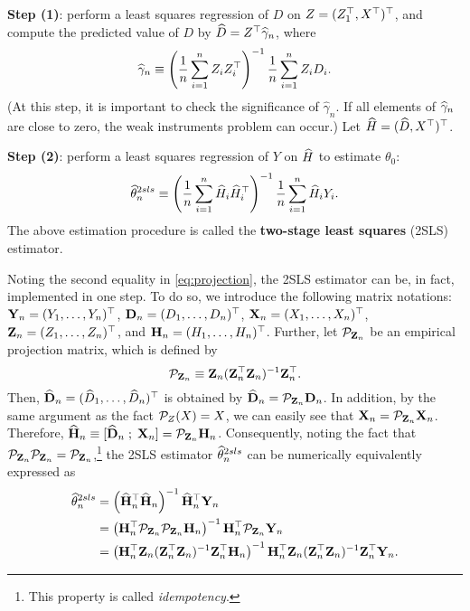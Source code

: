 \documentclass[11pt, A4paper, openany, uplatex]{book}
\begin{document}
\textbf{Step (1)}: perform a least squares regression of $D$ on $Z = (Z_1^\top, X^\top)^\top$, and compute the predicted value of $D$ by $\widehat D = Z^\top \widehat \gamma_n$, where
\[
\widehat \gamma_n \equiv \left( \frac{1}{n}\sum_{i=1}^n Z_i Z_i^\top \right)^{-1}\frac{1}{n}\sum_{i=1}^n Z_i D_i. 
\]
(At this step, it is important to check the significance of $\hat \gamma_n$.
If all elements of $\widehat \gamma_n$ are close to zero, the weak instruments problem can occur.)
Let $\widehat H = (\widehat D, X^\top)^\top$.

\textbf{Step (2)}: perform a least squares regression of $Y$ on $\widehat H$ to estimate $\theta_0$:
\[
	\widehat \theta_n^{2sls} \equiv \left( \frac{1}{n}\sum_{i=1}^n \widehat H_i \widehat H_i^\top \right)^{-1}\frac{1}{n}\sum_{i=1}^n \widehat H_i Y_i.
\]
The above estimation procedure is called the \textbf{two-stage least squares} (2SLS) estimator.

Noting the second equality in \eqref{eq:projection}, the 2SLS estimator can be, in fact, implemented in one step.
To do so, we introduce the following matrix notations: $\mathbf{Y}_n = (Y_1, \ldots , Y_n)^\top$, $\mathbf{D}_n = (D_1, \ldots, D_n)^\top$, $\mathbf{X}_n = (X_1, \ldots, X_n)^\top$, $\mathbf{Z}_n = (Z_1, \ldots, Z_n)^\top$, and $\mathbf{H}_n = (H_1, \dots , H_n)^\top$.
Further, let $\mathcal{P}_{\mathbf{Z}_n}$ be an empirical projection matrix, which is defined by
\[
	\mathcal{P}_{\mathbf{Z}_n} \equiv \mathbf{Z}_n(\mathbf{Z}_n^\top \mathbf{Z}_n)^{-1} \mathbf{Z}_n^\top.
\]
Then, $\widehat{\mathbf{D}}_n = (\widehat D_1, \ldots , \widehat D_n)^\top$ is obtained by $\widehat{\mathbf{D}}_n = \mathcal{P}_{\mathbf{Z}_n} \mathbf{D}_n$.
In addition, by the same argument as the fact $\mathcal{P}_Z(X) = X$, we can easily see that $\mathbf{X}_n = \mathcal{P}_{\mathbf{Z}_n} \mathbf{X}_n$.
Therefore, $\widehat{\mathbf{H}}_n \equiv [\widehat{\mathbf{D}}_n \; ; \; \mathbf{X}_n] = \mathcal{P}_{\mathbf{Z}_n}\mathbf{H}_n$.
Consequently, noting the fact that $\mathcal{P}_{\mathbf{Z}_n}\mathcal{P}_{\mathbf{Z}_n} = \mathcal{P}_{\mathbf{Z}_n}$,\footnote{This property is called \textit{idempotency}.} the 2SLS estimator $\widehat \theta_n^{2sls}$ can be numerically equivalently expressed as 
\begin{align}\label{eq:2slsMat}
	\begin{split}
	\widehat \theta_n^{2sls}
	& = \left(\widehat{\mathbf{H}}_n^\top \widehat{\mathbf{H}}_n \right)^{-1} \widehat{\mathbf{H}}_n^\top \mathbf{Y}_n\\
	& = \left(\mathbf{H}_n^\top \mathcal{P}_{\mathbf{Z}_n} \mathcal{P}_{\mathbf{Z}_n} \mathbf{H}_n \right)^{-1} \mathbf{H}_n^\top \mathcal{P}_{\mathbf{Z}_n} \mathbf{Y}_n \\
	& = \left(\mathbf{H}_n^\top  \mathbf{Z}_n(\mathbf{Z}_n^\top \mathbf{Z}_n)^{-1} \mathbf{Z}_n^\top \mathbf{H}_n \right)^{-1} \mathbf{H}_n^\top  \mathbf{Z}_n(\mathbf{Z}_n^\top \mathbf{Z}_n)^{-1} \mathbf{Z}_n^\top \mathbf{Y}_n.
	\end{split}
\end{align}
\end{document}
